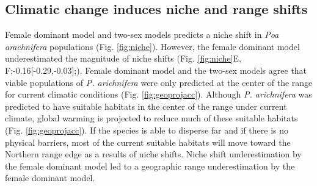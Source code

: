 \documentclass[12pt]{article}
\begin{document}
\subsection*{Climatic change induces niche and range shifts}
Female dominant model and  two-sex models predicts a niche shift in \emph{Poa arachnifera} populations (Fig. \ref{fig:niche}). 
%  
However, the female dominant model underestimated the magnitude of niche shifts (Fig. \ref{fig:niche}E, F;-0.16[-0.29,-0.03];).
Female dominant model and the two-sex models agree that viable populations of \emph{P. arichnifera} were only predicted at the center of the range for current climatic conditions (Fig. \ref{fig:geoprojacc}).
Although \emph{P. arichnifera} was predicted to have suitable habitats in the center of the range under current climate, global  warming is projected to reduce much of these suitable habitats (Fig. \ref{fig:geoprojacc}). 
If the species is able to disperse far and if there is no physical barriers, most of the current suitable habitats will move toward the Northern range edge as a results of niche shifts. 
Niche shift underestimation by the female dominant model led to a geographic range underestimation by the female dominant model.  
\end{document}

